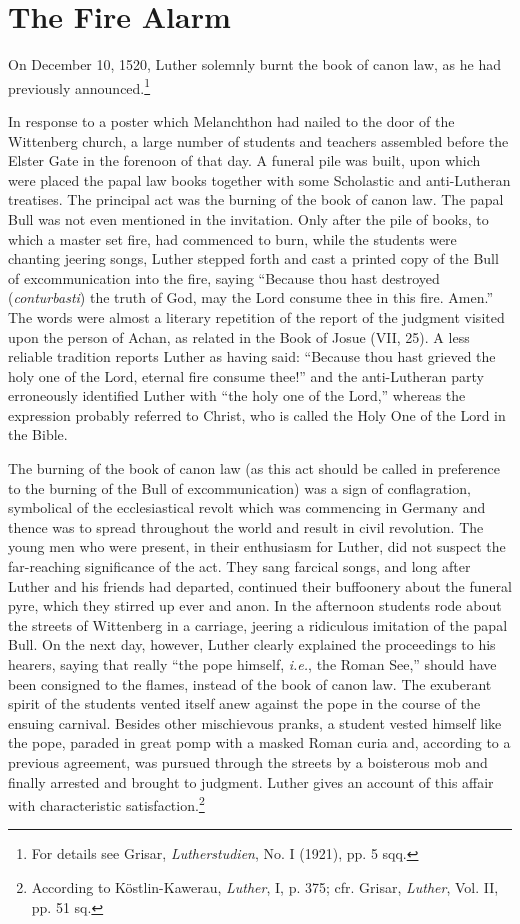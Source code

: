 \section{The Fire Alarm}

On December 10, 1520, Luther solemnly burnt the book of canon
law, as he had previously announced.\footnote
{For details see Grisar, \textit{Lutherstudien}, No. I (1921), pp. 5 sqq.}

In response to a poster which Melanchthon had nailed to the door
of the Wittenberg church, a large number of students and teachers
assembled before the Elster Gate in the forenoon of that day. A
funeral pile was built, upon which were placed the papal law books
together with some Scholastic and anti-Lutheran treatises. The principal
act was the burning of the book of canon law. The papal Bull
was not even mentioned in the invitation. Only after the pile of
books, to which a master set fire, had commenced to burn, while
the students were chanting jeering songs, Luther stepped forth and
cast a printed copy of the Bull of excommunication into the fire, saying
“Because thou hast destroyed (\textit{conturbasti}) the truth of God,
may the Lord consume thee in this fire. Amen.” The words were
almost a literary repetition of the report of the judgment visited upon
the person of Achan, as related in the Book of Josue (VII, 25). A
less reliable tradition reports Luther as having said: “Because thou
hast grieved the holy one of the Lord, eternal fire consume thee!”
and the anti-Lutheran party erroneously identified Luther with “the
holy one of the Lord,” whereas the expression probably referred to
Christ, who is called the Holy One of the Lord in the Bible.

The burning of the book of canon law (as this act should be called
in preference to the burning of the Bull of excommunication) was a
sign of conflagration, symbolical of the ecclesiastical revolt which
was commencing in Germany and thence was to spread throughout
the world and result in civil revolution. The young men who were
present, in their enthusiasm for Luther, did not suspect the far-reaching
significance of the act. They sang farcical songs, and long
after Luther and his friends had departed, continued their buffoonery
about the funeral pyre, which they stirred up ever and anon. In the
afternoon students rode about the streets of Wittenberg in a carriage,
jeering a ridiculous imitation of the papal Bull. On the next day,
however, Luther clearly explained the proceedings to his hearers, saying
that really “the pope himself, \textit{i.e.}, the Roman See,” should have
been consigned to the flames, instead of the book of canon law. The
exuberant spirit of the students vented itself anew against the pope in
the course of the ensuing carnival. Besides other mischievous pranks, a
student vested himself like the pope, paraded in great pomp with a
masked Roman curia and, according to a previous agreement, was pursued
through the streets by a boisterous mob and finally arrested and
brought to judgment. Luther gives an account of this affair with
characteristic satisfaction.\footnote
{According to Köstlin-Kawerau, \textit{Luther}, I, p. 375; cfr. Grisar, \textit{Luther}, Vol. II, pp.
51 sq.}

